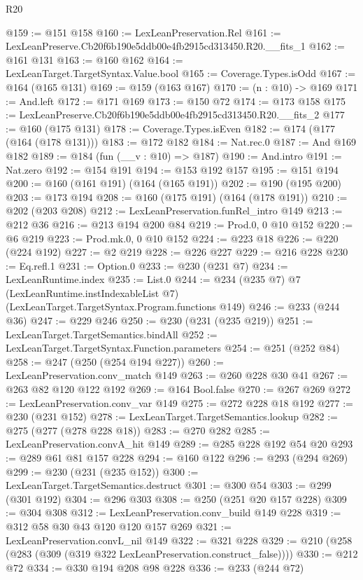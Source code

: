 \begin{lexlean}{R20}
\begin{coremodule}
@159 := @151 @158
@160 := LexLeanPreservation.Rel
@161 := LexLeanPreserve.Cb20f6b190e5ddb00e4fb2915cd313450.R20.__fits_1
@162 := @161 @131
@163 := @160 @162
@164 := LexLeanTarget.TargetSyntax.Value.bool
@165 := Coverage.Types.isOdd
@167 := @164 (@165 @131)
@169 := @159 (@163 @167)
@170 := (n : @10) -> @169
@171 := And.left
@172 := @171 @169
@173 := @150 @72
@174 := @173 @158
@175 := LexLeanPreserve.Cb20f6b190e5ddb00e4fb2915cd313450.R20.__fits_2
@177 := @160 (@175 @131)
@178 := Coverage.Types.isEven
@182 := @174 (@177 (@164 (@178 @131)))
@183 := @172 @182
@184 := Nat.rec.{0}
@187 := And @169 @182
@189 := @184 (fun (__v : @10) => @187)
@190 := And.intro
@191 := Nat.zero
@192 := @154 @191
@194 := @153 @192 @157
@195 := @151 @194
@200 := @160 (@161 @191) (@164 (@165 @191))
@202 := @190 (@195 @200)
@203 := @173 @194
@208 := @160 (@175 @191) (@164 (@178 @191))
@210 := @202 (@203 @208)
@212 := LexLeanPreservation.funRel_intro @149
@213 := @212 @36
@216 := @213 @194 @200 @84
@219 := Prod.{0, 0} @10 @152
@220 := @6 @219
@223 := Prod.mk.{0, 0} @10 @152
@224 := @223 @18
@226 := @220 (@224 @192)
@227 := @2 @219
@228 := @226 @227
@229 := @216 @228
@230 := Eq.refl.{1}
@231 := Option.{0}
@233 := @230 (@231 @7)
@234 := LexLeanRuntime.index
@235 := List.{0}
@244 := @234
    (@235 @7)
    @7
    (LexLeanRuntime.instIndexableList @7)
    (LexLeanTarget.TargetSyntax.Program.functions @149)
@246 := @233 (@244 @36)
@247 := @229 @246
@250 := @230 (@231 (@235 @219))
@251 := LexLeanTarget.TargetSemantics.bindAll
@252 := LexLeanTarget.TargetSyntax.Function.parameters
@254 := @251 (@252 @84)
@258 := @247 (@250 (@254 @194 @227))
@260 := LexLeanPreservation.conv_match @149
@263 := @260 @228 @30 @41
@267 := @263 @82 @120 @122 @192
@269 := @164 Bool.false
@270 := @267 @269
@272 := LexLeanPreservation.conv_var @149
@275 := @272 @228 @18 @192
@277 := @230 (@231 @152)
@278 := LexLeanTarget.TargetSemantics.lookup
@282 := @275 (@277 (@278 @228 @18))
@283 := @270 @282
@285 := LexLeanPreservation.convA_hit @149
@289 := @285 @228 @192 @54 @20
@293 := @289 @61 @81 @157 @228
@294 := @160 @122
@296 := @293 (@294 @269)
@299 := @230 (@231 (@235 @152))
@300 := LexLeanTarget.TargetSemantics.destruct
@301 := @300 @54
@303 := @299 (@301 @192)
@304 := @296 @303
@308 := @250 (@251 @20 @157 @228)
@309 := @304 @308
@312 := LexLeanPreservation.conv_build @149 @228
@319 := @312 @58 @30 @43 @120 @120 @157 @269
@321 := LexLeanPreservation.convL_nil @149
@322 := @321 @228
@329 := @210 (@258 (@283 (@309 (@319 @322 LexLeanPreservation.construct_false))))
@330 := @212 @72
@334 := @330 @194 @208 @98 @228
@336 := @233 (@244 @72)

\end{coremodule}
\end{lexlean}
